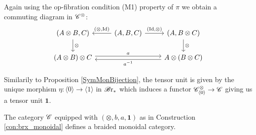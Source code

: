 \begin{const}
\begin{center}
    \end{center}

Again using the op-fibration condition (M1) property of $\pi$ we obtain a
commuting diagram in $\mathscr{C}^{\otimes}$:
\[
    \begin{tikzcd}
        {(A \otimes B, C)} \arrow[d, "\otimes"] & {(A,B,C)} \arrow[r, "{(\id, \otimes)}"] \arrow[l, "{(\otimes, \id)}"'] & {(A, B \otimes C)} \arrow[d, "\otimes"] \\
        (A \otimes B) \otimes C \arrow[rr, "a", shift left] &                                                                        & A \otimes (B \otimes C) \arrow[ll, "a^{-1}", shift left]                
    \end{tikzcd}
\]

Similarily to Proposition \ref{SymMonBijection}, the tensor unit is given by the
unique morphism $\eta \colon \langle 0 \rangle \to \langle 1 \rangle$ in $\mathscr{B} \text{r}_{\ast}$
which induces a functor $\mathscr{C}^{\otimes}_{\langle 0 \rangle} \to \mathscr{C}$ giving us a tensor
unit $\mathbf{1}$.
\end{const}

\begin{prop}\label{prop:braidmon} The category $\mathscr{C}$ equipped with $(\otimes, b,
    a, \mathbf{1})$ as in Construction \ref{con:brx_monoidal} defines a braided
    monoidal category.
\end{prop}

